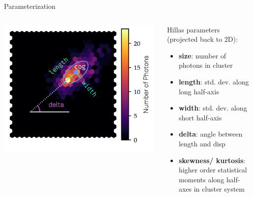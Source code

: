 \begin{frame}[t]{Parameterization}
\begin{columns}[onlytextwidth]
    \begin{column}{0.475\textwidth}
        \vspace{20px}
        \includegraphics[width=0.98\textwidth]{fig/hillas.png}
    \end{column}
    \begin{column}{0.475\textwidth}
    Hillas parameters (projected back to 2D): \\
        \begin{itemize}
            \setlength\itemsep{1em}
            \item \textbf{{\color{tugreen} size}}: number of photons in cluster
            \item \textbf{{\color{tugreen} length}}: std. dev. along long half-axis
            \item \textbf{{\color{tugreen} width}}: std. dev. along short half-axis
            \item \textbf{{\color{tugreen} delta}}: angle between length and disp
            \item \textbf{{\color{tugreen} skewness/ kurtosis}}: higher order statistical moments along half-axes in cluster system
        \end{itemize}
    \end{column}
\end{columns}
\end{frame}

